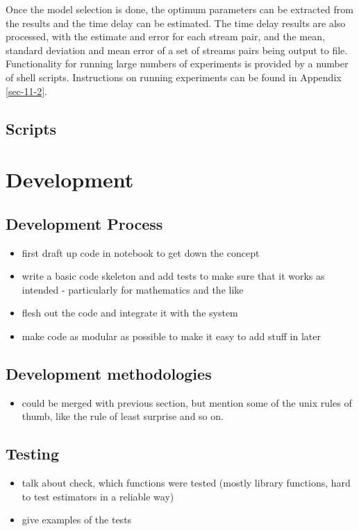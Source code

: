 \documentclass[a4paper,11pt]{article}
\begin{document}
   Once the model selection is done, the optimum parameters can be extracted
   from the results and the time delay can be estimated. The time delay results
   are also processed, with the estimate and error for each stream pair, and the
   mean, standard deviation and mean error of a set of streams pairs being
   output to file. Functionality for running large numbers of experiments is
   provided by a number of shell scripts. Instructions on running experiments
   can be found in Appendix \ref{sec-11-2}.
\subsection{Scripts}
\label{sec-3-7}
\section{Development}
\label{sec-4}
\subsection{Development Process}
\label{sec-4-1}

\begin{itemize}
\item first draft up code in notebook to get down the concept
\item write a basic code skeleton and add tests to make sure that it works as
  intended - particularly for mathematics and the like
\item flesh out the code and integrate it with the system
\item make code as modular as possible to make it easy to add stuff in later
\end{itemize}
\subsection{Development methodologies}
\label{sec-4-2}

\begin{itemize}
\item could be merged with previous section, but mention some of the unix rules of
  thumb, like the rule of least surprise and so on.
\end{itemize}
\subsection{Testing}
\label{sec-4-3}

\begin{itemize}
\item talk about check, which functions were tested (mostly library functions, hard
  to test estimators in a reliable way)
\item give examples of the tests
\end{itemize}
\end{document}
